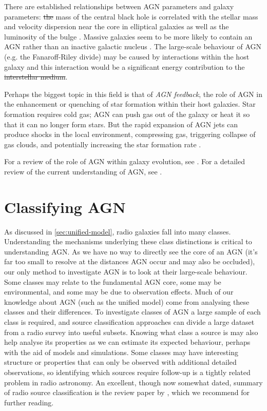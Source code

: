 \documentclass[11pt, a4paper]{book}
\newcommand{\defn}[1]{\emph{#1}}
\providecommand{\DIFaddtex}[1]{{\protect\color{blue}\uwave{#1}}} %
\providecommand{\DIFdeltex}[1]{{\protect\color{red}\sout{#1}}}                      %
\providecommand{\DIFaddbegin}{} %
\providecommand{\DIFaddend}{} %
\providecommand{\DIFdelbegin}{} %
\providecommand{\DIFdelend}{} %
\providecommand{\DIFadd}[1]{\texorpdfstring{\DIFaddtex{#1}}{#1}} %
\providecommand{\DIFdel}[1]{\texorpdfstring{\DIFdeltex{#1}}{}} %
\newcommand{\DIFscaledelfig}{0.5}
\newlength{\DIFdelgraphicswidth} %
\newlength{\DIFdelgraphicsheight} %
\newcommand{\DIFaddincludegraphics}[2][]{{\color{blue}\fbox{\DIFOincludegraphics[#1]{#2}}}} %
\newcommand{\DIFdelincludegraphics}[2][]{%
\sbox{\DIFdelgraphicsbox}{\DIFOincludegraphics[#1]{#2}}%
\settoboxwidth{\DIFdelgraphicswidth}{\DIFdelgraphicsbox} %
\settoboxtotalheight{\DIFdelgraphicsheight}{\DIFdelgraphicsbox} %
\scalebox{\DIFscaledelfig}{%
\parbox[b]{\DIFdelgraphicswidth}{\usebox{\DIFdelgraphicsbox}\\[-\baselineskip] \rule{\DIFdelgraphicswidth}{0em}}\llap{\resizebox{\DIFdelgraphicswidth}{\DIFdelgraphicsheight}{%
\setlength{\unitlength}{\DIFdelgraphicswidth}%
\begin{picture}(1,1)%
\thicklines\linethickness{2pt} %
{\color[rgb]{1,0,0}\put(0,0){\framebox(1,1){}}}%
{\color[rgb]{1,0,0}\put(0,0){\line( 1,1){1}}}%
{\color[rgb]{1,0,0}\put(0,1){\line(1,-1){1}}}%
\end{picture}%
}\hspace*{3pt}}} %
} %
\DeclareRobustCommand{\DIFaddbegin}{\DIFOaddbegin \let\includegraphics\DIFaddincludegraphics} %
\DeclareRobustCommand{\DIFaddend}{\DIFOaddend \let\includegraphics\DIFOincludegraphics} %
\DeclareRobustCommand{\DIFdelbegin}{\DIFOdelbegin \let\includegraphics\DIFdelincludegraphics} %
\DeclareRobustCommand{\DIFdelend}{\DIFOaddend \let\includegraphics\DIFOincludegraphics} %
\begin{document}
        There are established relationships between AGN parameters and galaxy parameters: \DIFdelbegin \DIFdel{the }\DIFdelend \DIFaddbegin \DIFadd{The }\DIFaddend mass of the central black hole is correlated with the stellar mass and velocity dispersion near the core in elliptical galaxies \citep{cattaneo_role_2009} as well as the luminosity of the bulge \citep{kormendy_inward_1995}. Massive galaxies seem to be more likely to contain an AGN rather than an inactive galactic nucleus \citep{hardcastle20feedback}. The large-scale behaviour of AGN (e.g. the Fanaroff-Riley divide) may be caused by interactions within the host galaxy \citep{hardcastle20feedback} and this interaction would be a significant energy contribution to the \DIFdelbegin \DIFdel{interstellar medium}\DIFdelend \DIFaddbegin \DIFadd{ISM}\DIFaddend .

        Perhaps the biggest topic in this field is that of \defn{AGN feedback}, the role of AGN in the enhancement or quenching of star formation within their host galaxies. Star formation requires cold gas; AGN can push gas out of the galaxy \citep{zubovas_clearing_2012} or heat it so that it can no longer form stars. But the rapid expansion of AGN jets can produce shocks in the local environment, compressing gas, triggering collapse of gas clouds, and potentially increasing the star formation rate \citep{zubovas_collapse_2014}.

        For a review of the role of AGN within galaxy evolution, see \citet{kormendy_coevolution_2013}. For a detailed review of the current understanding of AGN, see \citet{hardcastle20feedback}.

\section{Classifying AGN}
\label{sec:classification-of-agn}

    As discussed in \autoref{sec:unified-model}, radio galaxies fall into many classes. Understanding the mechanisms underlying these class distinctions is critical to understanding AGN. As we have no way to directly see the core of an AGN (it's far too small to resolve at the distances AGN occur and may also be occluded), our only method to investigate AGN is to look at their large-scale behaviour. Some classes may relate to the fundamental AGN core, some may be environmental, and some may be due to observation effects. Much of our knowledge about AGN (such as the unified model) come from analysing these classes and their differences. To investigate classes of AGN a large sample of each class is required, and source classification approaches can divide a large dataset from a radio survey into useful subsets. Knowing what class a source is may also help analyse its properties as we can estimate its expected behaviour, perhaps with the aid of models and simulations. Some classes may have interesting structure or properties that can only be observed with additional detailed observations, so identifying which sources require follow-up is a tightly related problem in radio astronomy. An excellent, though now somewhat dated, summary of radio source classification is the review paper by \citet{urry95unified}, which we recommend for further reading.
\end{document}
